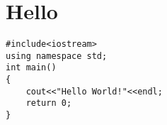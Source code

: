 \section{Hello}
\begin{lstlisting}
#include<iostream>
using namespace std;
int main()
{
	cout<<"Hello World!"<<endl;
	return 0;
}
\end{lstlisting}